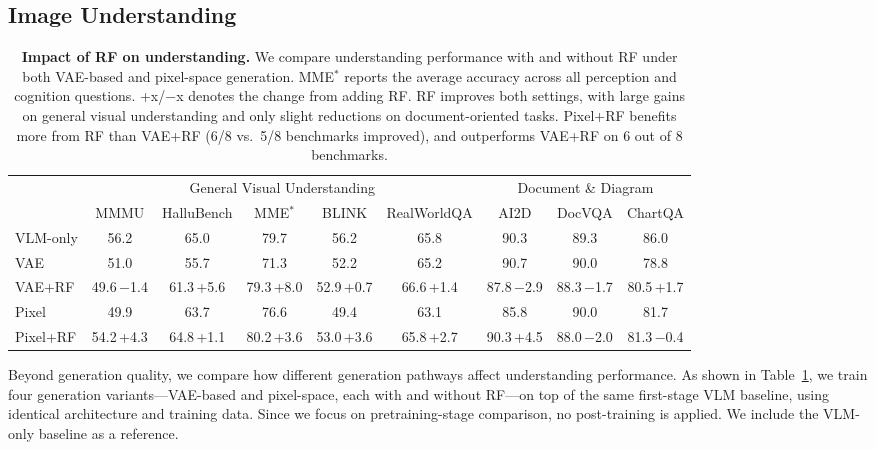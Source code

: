 \subsection{Image Understanding}
\label{sec:understanding}
\begin{table}[t]
\centering
\footnotesize
\setlength{\tabcolsep}{5pt}
\caption{\textbf{Impact of RF on understanding.} We compare understanding performance with and without RF under both VAE-based and pixel-space generation. MME$^*$ reports the average accuracy across all perception and cognition questions. {\tiny\color{teal}+x}/{\tiny\color{red}$-$x} denotes the change from adding RF. RF improves both settings, with large gains on general visual understanding and only slight reductions on document-oriented tasks. Pixel+RF benefits more from RF than VAE+RF (6/8 vs.\ 5/8 benchmarks improved), and outperforms VAE+RF on 6 out of 8 benchmarks.}
\label{tab:understanding}
\begin{tabular}{l|ccccc|ccc}
\toprule
& \multicolumn{5}{c|}{General Visual Understanding} & \multicolumn{3}{c}{Document \& Diagram} \\
\cmidrule(lr){2-6} \cmidrule(lr){7-9}
& MMMU & HalluBench & MME$^*$ & BLINK & RealWorldQA & AI2D & DocVQA & ChartQA \\
\midrule
VLM-only & 56.2 & 65.0 & 79.7 & 56.2 & 65.8 & 90.3 & 89.3 & 86.0 \\
\midrule
VAE    & 51.0 & 55.7 & 71.3 & 52.2 & 65.2 & 90.7 & 90.0 & 78.8 \\
VAE+RF & 49.6{\tiny\color{red}\,$-$1.4} & 61.3{\tiny\color{teal}\,+5.6} & 79.3{\tiny\color{teal}\,+8.0} & 52.9{\tiny\color{teal}\,+0.7} & 66.6{\tiny\color{teal}\,+1.4} & 87.8{\tiny\color{red}\,$-$2.9} & 88.3{\tiny\color{red}\,$-$1.7} & 80.5{\tiny\color{teal}\,+1.7} \\
\midrule
Pixel    & 49.9 & 63.7 & 76.6 & 49.4 & 63.1 & 85.8 & 90.0 & 81.7 \\
Pixel+RF & 54.2{\tiny\color{teal}\,+4.3} & 64.8{\tiny\color{teal}\,+1.1} & 80.2{\tiny\color{teal}\,+3.6} & 53.0{\tiny\color{teal}\,+3.6} & 65.8{\tiny\color{teal}\,+2.7} & 90.3{\tiny\color{teal}\,+4.5} & 88.0{\tiny\color{red}\,$-$2.0} & 81.3{\tiny\color{red}\,$-$0.4} \\
\bottomrule
\end{tabular}
\end{table}


Beyond generation quality, we compare how different generation pathways affect understanding performance. As shown in Table~\ref{tab:understanding}, we train four generation variants---VAE-based and pixel-space, each with and without RF---on top of the same first-stage VLM baseline, using identical architecture and training data. Since we focus on pretraining-stage comparison, no post-training is applied. We include the VLM-only baseline as a reference.

